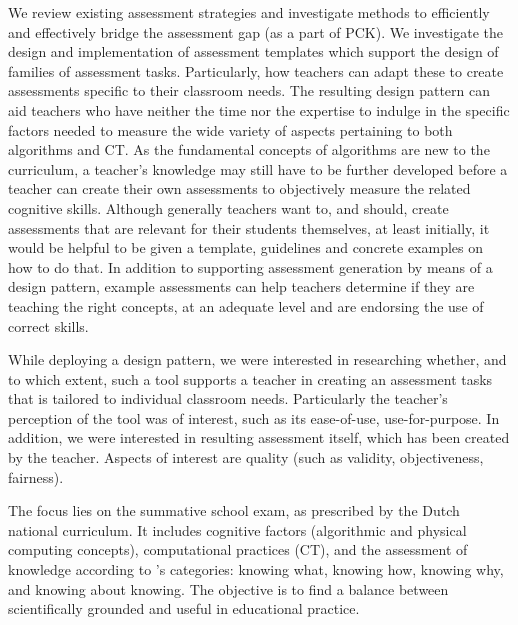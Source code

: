 We review existing assessment strategies and investigate methods to efficiently and effectively bridge the assessment gap (as a part of PCK). We investigate the design and implementation of assessment templates which support the design of families of assessment tasks. Particularly, how teachers can adapt these to create assessments specific to their classroom needs. The resulting design pattern can aid teachers who have neither the time nor the expertise to indulge in the specific factors needed to measure the wide variety of aspects pertaining to both algorithms and CT. As the fundamental concepts of algorithms are new to the curriculum, a teacher’s knowledge may still have to be further developed before a teacher can create their own assessments to objectively measure the related cognitive skills. Although generally teachers want to, and should, create assessments that are relevant for their students themselves, at least initially, it would be helpful to be given a template, guidelines and concrete examples on how to do that. In addition to supporting assessment generation by means of a design pattern, example assessments can help teachers determine if they are teaching the right concepts, at an adequate level and are endorsing the use of correct skills.

While deploying a design pattern, we were interested in researching whether, and to which extent, such a tool supports a teacher in creating an assessment tasks that is tailored to individual classroom needs. Particularly the teacher’s perception of the tool was of interest, such as its ease-of-use, use-for-purpose. In addition, we were interested in resulting assessment itself, which has been created by the teacher. Aspects of interest are quality (such as validity, objectiveness, fairness).

The focus lies on the summative school exam, as prescribed by the Dutch national curriculum.
It includes cognitive factors (algorithmic and physical computing concepts), computational practices (CT), and the assessment of knowledge according to \citeauthor{streun2001kennis}'s categories: knowing what, knowing how, knowing why, and knowing about knowing. The objective is to find a balance between scientifically grounded and useful in educational practice.





